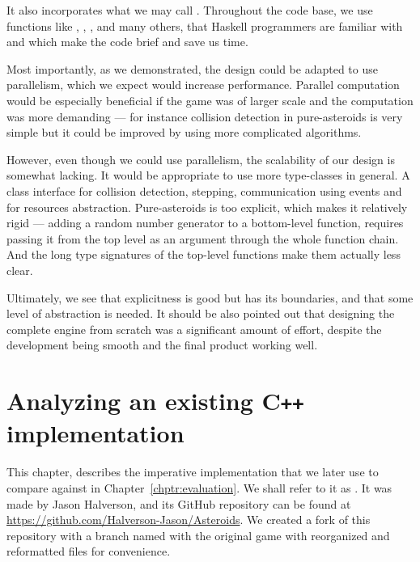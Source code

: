 \documentclass[
  digital, %
  color,   %
  table,   %
  oneside, %
  lof,     %
  lot,     %
]{fithesis3}
\newcommand{\cpp}{C\nolinebreak\texttt{+}\nolinebreak\texttt{+}}
\begin{document}
{It also incorporates what we may call .
Throughout the code base, we use functions like , ,
,  and many others, that Haskell programmers are familiar
with and which make the code brief and save us time.

Most importantly, as we demonstrated, the design could be adapted to
use parallelism, which we expect would increase performance.
Parallel computation would be especially beneficial if the game was of larger scale
and the computation was more demanding --- for instance collision detection
in pure-asteroids is very simple but it could be improved by using more
complicated algorithms.

However, even though we could use parallelism, the scalability of our design is somewhat lacking.
It would be appropriate to use more type-classes in general. A class interface for
collision detection, stepping, communication using events and for resources abstraction.
Pure-asteroids is too explicit, which makes it relatively rigid
--- adding a random number
generator to a bottom-level function, requires passing it from the top level
as an argument through the whole function chain. And the long type signatures of the
top-level functions make them actually less clear.

Ultimately, we see that explicitness is good but has its boundaries,
and that some level of abstraction is needed. 
It should be also pointed out that designing the complete engine from scratch
was a significant amount of effort, despite the development being smooth and the final
product working well.





\chapter{Analyzing an existing \cpp{} implementation}
\label{chptr:impasteroids}

This chapter, describes the imperative implementation that we later
use to compare against in Chapter~\ref{chptr:evaluation}.
We shall refer to it as .
It was made by Jason Halverson, and its GitHub repository can be found at
\url{https://github.com/Halverson-Jason/Asteroids}. We created a fork of
this repository with a branch named \cite{impasteroidsrepo}
with the original game with reorganized and reformatted files for convenience.

}
\end{document}
